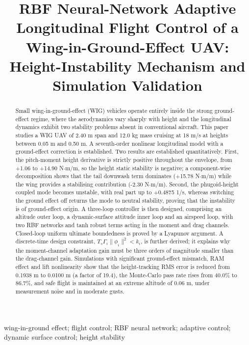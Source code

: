 \documentclass[conference]{IEEEtran}
\begin{document}
\title{RBF Neural-Network Adaptive Longitudinal Flight Control of a Wing-in-Ground-Effect UAV: Height-Instability Mechanism and Simulation Validation}

\author{
\IEEEauthorblockN{}
}

\maketitle

\begin{abstract}
Small wing-in-ground-effect (WIG) vehicles operate entirely inside the strong ground-effect regime, where the aerodynamics vary sharply with height and the longitudinal dynamics exhibit two stability problems absent in conventional aircraft. This paper studies a WIG UAV of 2.40 m span and 12.0 kg mass cruising at 18 m/s at heights between 0.05 m and 0.50 m. A seventh-order nonlinear longitudinal model with a ground-effect correction is established. Two results are established quantitatively. First, the pitch-moment height derivative is strictly positive throughout the envelope, from +1.06 to +14.90 N$\cdot$m/m, so the height static stability is negative; a component-wise decomposition shows that the tail downwash term dominates (+15.78 N$\cdot$m/m) while the wing provides a stabilising contribution (-2.30 N$\cdot$m/m). Second, the phugoid-height coupled mode becomes unstable, with real part up to +0.4875 1/s, whereas switching the ground effect off returns the mode to neutral stability, proving that the instability is of ground-effect origin. A three-loop controller is then designed, comprising an altitude outer loop, a dynamic-surface attitude inner loop and an airspeed loop, with two RBF networks and tanh robust terms acting in the moment and drag channels. Closed-loop uniform ultimate boundedness is proved by a Lyapunov argument. A discrete-time design constraint, $T_s\Gamma_i\|\phi_i\|^2 < k_i$, is further derived; it explains why the moment-channel adaptation gain must be three orders of magnitude smaller than the drag-channel gain. Simulations with significant ground-effect mismatch, RAM effect and lift nonlinearity show that the height-tracking RMS error is reduced from 0.1938 m to 0.0100 m (a factor of 19.4), the Monte-Carlo pass rate rises from 40.0\% to 86.7\%, and safe flight is maintained at an extreme altitude of 0.06 m, under measurement noise and in moderate gusts.
\end{abstract}

\begin{IEEEkeywords}
wing-in-ground effect; flight control; RBF neural network; adaptive control; dynamic surface control; height stability
\end{IEEEkeywords}
\end{document}
